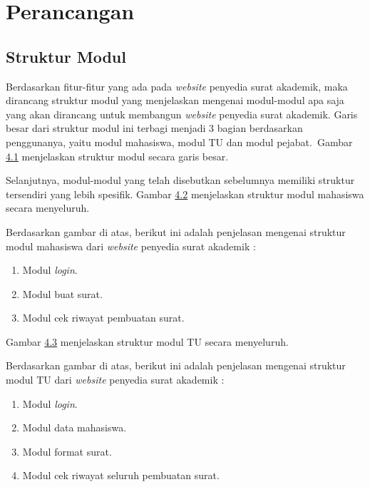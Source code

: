\chapter{Perancangan}
\label{chap:perancangan}

\section{Struktur Modul}
\label{sec:struktur_modul}
Berdasarkan fitur-fitur yang ada pada \textit{website} penyedia surat akademik, maka dirancang struktur modul yang menjelaskan mengenai modul-modul apa saja yang akan dirancang untuk membangun \textit{website} penyedia surat akademik. Garis besar dari struktur modul ini terbagi menjadi 3 bagian berdasarkan penggunanya, yaitu modul mahasiswa, modul TU dan modul pejabat.\
Gambar \hyperlink{struktur_modul_garis_besar}{4.1} menjelaskan struktur modul secara garis besar.



Selanjutnya, modul-modul yang telah disebutkan sebelumnya memiliki struktur tersendiri yang lebih spesifik. Gambar \hyperlink{struktur_modul_mahasiswa}{4.2} menjelaskan struktur modul mahasiswa secara menyeluruh.



Berdasarkan gambar di atas, berikut ini adalah penjelasan mengenai struktur modul mahasiswa dari \textit{\textit{website}} penyedia surat akademik :
\begin{enumerate}
	\item Modul \textit{login}.
	\item Modul buat surat.
	\item Modul cek riwayat pembuatan surat.
\end{enumerate}

Gambar \hyperlink{struktur_modul_tu}{4.3} menjelaskan struktur modul TU secara menyeluruh.


Berdasarkan gambar di atas, berikut ini adalah penjelasan mengenai struktur modul TU dari \textit{\textit{website}} penyedia surat akademik :
\begin{enumerate}
	\item Modul \textit{login}.
	\item Modul data mahasiswa.
	\item Modul format surat.
	\item Modul cek riwayat seluruh pembuatan surat.
\end{enumerate}

